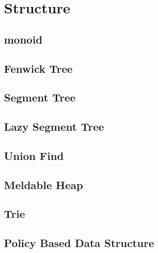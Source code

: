 \section{Structure}

\subsection{monoid}


\subsection{Fenwick Tree}


\subsection{Segment Tree}


\subsection{Lazy Segment Tree}





\subsection{Union Find}


\subsection{Meldable Heap}


\subsection{Trie}


\subsection{Policy Based Data Structure}

